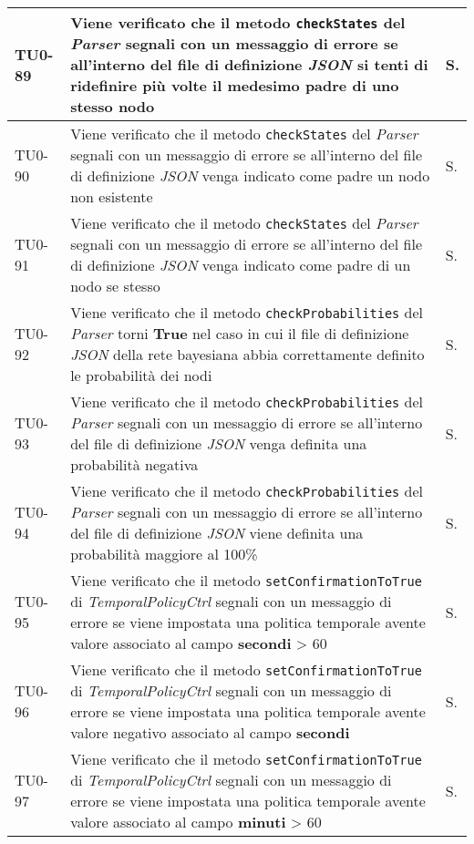 \begin{longtable}{|C{.15\textwidth}|m{.66\textwidth}|C{.10\textwidth}|}
\hline
{}TU0-89 & Viene verificato che il metodo \texttt{checkStates} del \textit{Parser} segnali con un messaggio di errore se all'interno del file di definizione \textit{JSON} si tenti di ridefinire più volte il medesimo padre di uno stesso nodo & S.\\
\hline
TU0-90 & Viene verificato che il metodo \texttt{checkStates} del \textit{Parser} segnali con un messaggio di errore se all'interno del file di definizione \textit{JSON} venga indicato come padre un nodo non esistente & S.\\
\hline
{}TU0-91 & Viene verificato che il metodo \texttt{checkStates} del \textit{Parser} segnali con un messaggio di errore se all'interno del file di definizione \textit{JSON} venga indicato come padre di un nodo se stesso & S.\\
\hline
TU0-92 & Viene verificato che il metodo \texttt{checkProbabilities} del \textit{Parser} torni \textbf{True} nel caso in cui il file di definizione \textit{JSON} della rete bayesiana abbia correttamente definito le probabilità dei nodi & S.\\
\hline
{}TU0-93 & Viene verificato che il metodo \texttt{checkProbabilities} del \textit{Parser} segnali con un messaggio di errore se all'interno del file di definizione \textit{JSON} venga definita una probabilità negativa & S.\\
\hline
TU0-94 & Viene verificato che il metodo \texttt{checkProbabilities} del \textit{Parser} segnali con un messaggio di errore se all'interno del file di definizione \textit{JSON} viene definita una probabilità maggiore al 100\% & S.\\
\hline
{}TU0-95 & Viene verificato che il metodo \texttt{setConfirmationToTrue} di \textit{TemporalPolicyCtrl} segnali con un messaggio di errore se viene impostata una politica temporale avente valore associato al campo \textbf{secondi} > 60 & S.\\
\hline
TU0-96 & Viene verificato che il metodo \texttt{setConfirmationToTrue} di \textit{TemporalPolicyCtrl} segnali con un messaggio di errore se viene impostata una politica temporale avente valore negativo associato al campo \textbf{secondi} & S.\\
\hline
{}TU0-97 & Viene verificato che il metodo \texttt{setConfirmationToTrue} di \textit{TemporalPolicyCtrl} segnali con un messaggio di errore se viene impostata una politica temporale avente valore associato al campo \textbf{minuti} > 60 & S.\\

\end{longtable}

